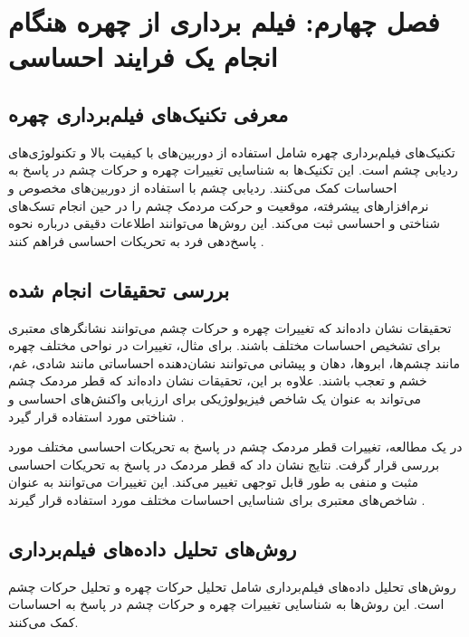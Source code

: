 \documentclass[12pt]{article}
\begin{document}
\section{فصل چهارم: فیلم برداری از چهره هنگام انجام یک فرایند احساسی}

\subsection{معرفی تکنیک‌های فیلم‌برداری چهره}

تکنیک‌های فیلم‌برداری چهره شامل استفاده از دوربین‌های با کیفیت بالا و تکنولوژی‌های ردیابی چشم است. این تکنیک‌ها به شناسایی تغییرات چهره و حرکات چشم در پاسخ به احساسات کمک می‌کنند. ردیابی چشم با استفاده از دوربین‌های مخصوص و نرم‌افزارهای پیشرفته، موقعیت و حرکت مردمک چشم را در حین انجام تسک‌های شناختی و احساسی ثبت می‌کند. این روش‌ها می‌توانند اطلاعات دقیقی درباره نحوه پاسخ‌دهی فرد به تحریکات احساسی فراهم کنند \cite{Nweke2019}.

\subsection{بررسی تحقیقات انجام شده}

تحقیقات نشان داده‌اند که تغییرات چهره و حرکات چشم می‌توانند نشانگرهای معتبری برای تشخیص احساسات مختلف باشند. برای مثال، تغییرات در نواحی مختلف چهره مانند چشم‌ها، ابروها، دهان و پیشانی می‌توانند نشان‌دهنده احساساتی مانند شادی، غم، خشم و تعجب باشند. علاوه بر این، تحقیقات نشان داده‌اند که قطر مردمک چشم می‌تواند به عنوان یک شاخص فیزیولوژیکی برای ارزیابی واکنش‌های احساسی و شناختی مورد استفاده قرار گیرد \cite{Nweke2019}.

در یک مطالعه، تغییرات قطر مردمک چشم در پاسخ به تحریکات احساسی مختلف مورد بررسی قرار گرفت. نتایج نشان داد که قطر مردمک در پاسخ به تحریکات احساسی مثبت و منفی به طور قابل توجهی تغییر می‌کند. این تغییرات می‌توانند به عنوان شاخص‌های معتبری برای شناسایی احساسات مختلف مورد استفاده قرار گیرند \cite{Partala2003}.

\subsection{روش‌های تحلیل داده‌های فیلم‌برداری}

روش‌های تحلیل داده‌های فیلم‌برداری شامل تحلیل حرکات چهره و تحلیل حرکات چشم است. این روش‌ها به شناسایی تغییرات چهره و حرکات چشم در پاسخ به احساسات کمک می‌کنند.
\end{document}
